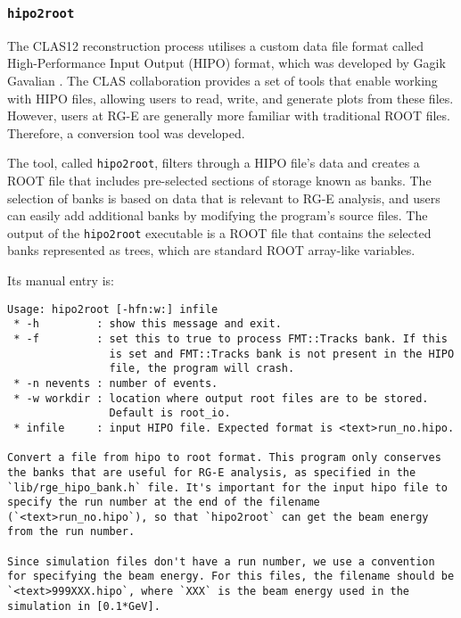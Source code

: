 \subsubsection{\texttt{hipo2root}}
\label{sssec::hipo2root}
    The CLAS12 reconstruction process utilises a custom data file format called High-Performance Input Output (HIPO) format, which was developed by Gagik Gavalian \cite{chekanov2021}.
    The CLAS collaboration provides a set of tools that enable working with HIPO files, allowing users to read, write, and generate plots from these files.
    However, users at RG-E are generally more familiar with traditional ROOT files. Therefore, a conversion tool was developed.

    The tool, called \texttt{hipo2root}, filters through a HIPO file's data and creates a ROOT file that includes pre-selected sections of storage known as banks.
    The selection of banks is based on data that is relevant to RG-E analysis, and users can easily add additional banks by modifying the program's source files.
    The output of the \texttt{hipo2root} executable is a ROOT file that contains the selected banks represented as trees, which are standard ROOT array-like variables.

    Its manual entry is:
    \begin{lstlisting}
Usage: hipo2root [-hfn:w:] infile
 * -h         : show this message and exit.
 * -f         : set this to true to process FMT::Tracks bank. If this
                is set and FMT::Tracks bank is not present in the HIPO
                file, the program will crash.
 * -n nevents : number of events.
 * -w workdir : location where output root files are to be stored.
                Default is root_io.
 * infile     : input HIPO file. Expected format is <text>run_no.hipo.

Convert a file from hipo to root format. This program only conserves the banks that are useful for RG-E analysis, as specified in the `lib/rge_hipo_bank.h` file. It's important for the input hipo file to specify the run number at the end of the filename (`<text>run_no.hipo`), so that `hipo2root` can get the beam energy from the run number.

Since simulation files don't have a run number, we use a convention for specifying the beam energy. For this files, the filename should be `<text>999XXX.hipo`, where `XXX` is the beam energy used in the simulation in [0.1*GeV].
    \end{lstlisting}
